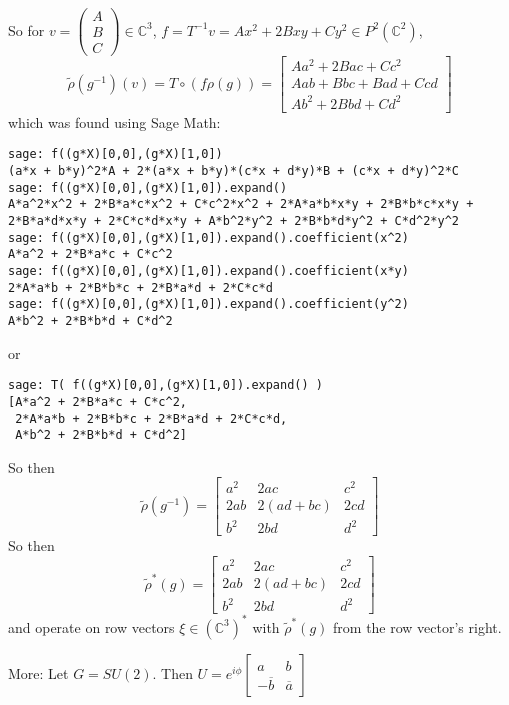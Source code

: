 \documentclass[10pt]{amsart}
\begin{document}
\begin{multicols*}{2}
\begin{enumerate}
So for $v = \left( \begin{matrix} A \\ B \\ C \end{matrix} \right) \in \mathbb{C}^3$, $f = T^{-1}v = Ax^2 + 2Bxy + Cy^2 \in P^2(\mathbb{C}^2)$, 
\[
\widetilde{\rho}(g^{-1})(v) = T \circ ( f \rho(g) ) = \left[ \begin{matrix} Aa^2 + 2Bac + Cc^2 \\
    Aab + Bbc + Bad + Ccd \\
    Ab^2 + 2Bbd + Cd^2 \end{matrix} \right]
\]
which was found using Sage Math:
\begin{lstlisting}
sage: f((g*X)[0,0],(g*X)[1,0])
(a*x + b*y)^2*A + 2*(a*x + b*y)*(c*x + d*y)*B + (c*x + d*y)^2*C
sage: f((g*X)[0,0],(g*X)[1,0]).expand()
A*a^2*x^2 + 2*B*a*c*x^2 + C*c^2*x^2 + 2*A*a*b*x*y + 2*B*b*c*x*y + 2*B*a*d*x*y + 2*C*c*d*x*y + A*b^2*y^2 + 2*B*b*d*y^2 + C*d^2*y^2
sage: f((g*X)[0,0],(g*X)[1,0]).expand().coefficient(x^2)
A*a^2 + 2*B*a*c + C*c^2
sage: f((g*X)[0,0],(g*X)[1,0]).expand().coefficient(x*y)
2*A*a*b + 2*B*b*c + 2*B*a*d + 2*C*c*d
sage: f((g*X)[0,0],(g*X)[1,0]).expand().coefficient(y^2)
A*b^2 + 2*B*b*d + C*d^2
\end{lstlisting}
or 
\begin{lstlisting}
sage: T( f((g*X)[0,0],(g*X)[1,0]).expand() )
[A*a^2 + 2*B*a*c + C*c^2,
 2*A*a*b + 2*B*b*c + 2*B*a*d + 2*C*c*d,
 A*b^2 + 2*B*b*d + C*d^2]
\end{lstlisting}

So then 
\[
\widetilde{\rho}(g^{-1}) = \left[ \begin{matrix} a^2 & 2ac & c^2 \\ 2ab & 2(ad+bc) & 2cd \\ b^2 & 2bd & d^2 \end{matrix} \right]
\]
So then 
\[
\widetilde{\rho}^*(g) = \left[ \begin{matrix} a^2 & 2ac & c^2 \\ 2ab & 2(ad+bc) & 2cd \\ b^2 & 2bd & d^2 \end{matrix} \right]
\]
and operate on row vectors $\xi \in (\mathbb{C}^3)^*$ with $\widetilde{\rho}^*(g)$ from the row vector's right.  
\end{enumerate}

More: Let $G = SU(2)$.  Then $U = e^{i\phi} \left[ \begin{matrix} a & b \\ -\overline{b} & \overline{a} \end{matrix} \right]$


\end{multicols*}
\end{document}
